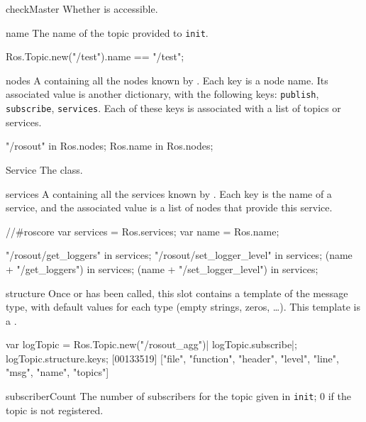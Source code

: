 \begin{urbiscriptapi}
\item[checkMaster]
  Whether  is accessible.


\item[name]%
  The name of the topic provided to \lstinline{init}.
\begin{urbiassert}
Ros.Topic.new("/test").name == "/test";
\end{urbiassert}


\item[nodes]%
  A  containing all the nodes known by
  . Each key is a node name. Its associated value is
  another dictionary, with the following keys: \lstinline{publish},
  \lstinline{subscribe}, \lstinline{services}.  Each of these keys is
  associated with a list of topics or services.
\begin{urbiassert}
"/rosout" in Ros.nodes;
Ros.name in Ros.nodes;
\end{urbiassert}


\item[Service]%
  The  class.


\item[services]%
  A  containing all the services known by
  . Each key is the name of a service, and the associated
  value is a list of nodes that provide this service.
\begin{urbiassert}
//#roscore
var services = Ros.services;
var name = Ros.name;

       "/rosout/get_loggers" in services;
  "/rosout/set_logger_level" in services;
     (name + "/get_loggers") in services;
(name + "/set_logger_level") in services;
\end{urbiassert}


\item[structure]%
  Once  or  has been called, this slot
  contains a template of the message type, with default values for each type
  (empty strings, zeros, \ldots).  This template is a
  .
\begin{urbiscript}
var logTopic = Ros.Topic.new("/rosout_agg")|
logTopic.subscribe|;
logTopic.structure.keys;
[00133519] ["file", "function", "header", "level", "line", "msg", "name", "topics"]
\end{urbiscript}


\item[subscriberCount]%
  The number of subscribers for the topic given in \lstinline{init}; 0 if
  the topic is not registered.



\end{urbiscriptapi}
